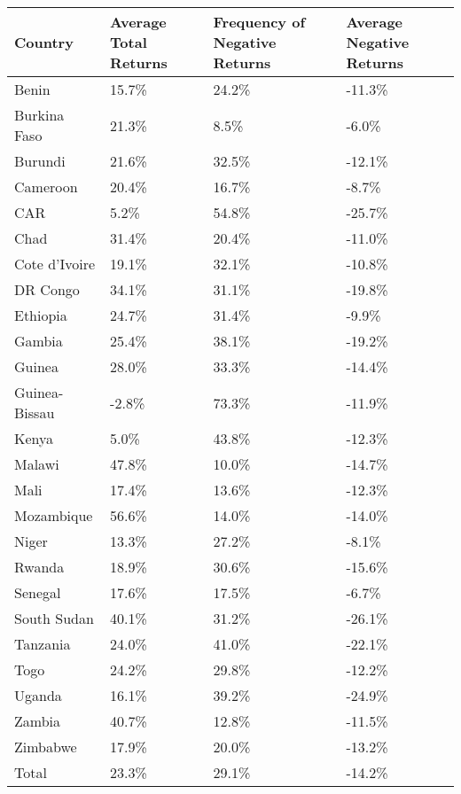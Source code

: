 \begin{table}[ht]
\centering
\begin{tabular}{llll}
  \hline
Country & Average Total Returns & Frequency of Negative Returns & Average Negative Returns \\ 
  \hline
Benin & 15.7\% & 24.2\% & -11.3\% \\ 
  Burkina Faso & 21.3\% & 8.5\% & -6.0\% \\ 
  Burundi & 21.6\% & 32.5\% & -12.1\% \\ 
  Cameroon & 20.4\% & 16.7\% & -8.7\% \\ 
  CAR & 5.2\% & 54.8\% & -25.7\% \\ 
  Chad & 31.4\% & 20.4\% & -11.0\% \\ 
  Cote d'Ivoire & 19.1\% & 32.1\% & -10.8\% \\ 
  DR Congo & 34.1\% & 31.1\% & -19.8\% \\ 
  Ethiopia & 24.7\% & 31.4\% & -9.9\% \\ 
  Gambia & 25.4\% & 38.1\% & -19.2\% \\ 
  Guinea & 28.0\% & 33.3\% & -14.4\% \\ 
  Guinea-Bissau & -2.8\% & 73.3\% & -11.9\% \\ 
  Kenya & 5.0\% & 43.8\% & -12.3\% \\ 
  Malawi & 47.8\% & 10.0\% & -14.7\% \\ 
  Mali & 17.4\% & 13.6\% & -12.3\% \\ 
  Mozambique & 56.6\% & 14.0\% & -14.0\% \\ 
  Niger & 13.3\% & 27.2\% & -8.1\% \\ 
  Rwanda & 18.9\% & 30.6\% & -15.6\% \\ 
  Senegal & 17.6\% & 17.5\% & -6.7\% \\ 
  South Sudan & 40.1\% & 31.2\% & -26.1\% \\ 
  Tanzania & 24.0\% & 41.0\% & -22.1\% \\ 
  Togo & 24.2\% & 29.8\% & -12.2\% \\ 
  Uganda & 16.1\% & 39.2\% & -24.9\% \\ 
  Zambia & 40.7\% & 12.8\% & -11.5\% \\ 
  Zimbabwe & 17.9\% & 20.0\% & -13.2\% \\ 
  Total & 23.3\% & 29.1\% & -14.2\% \\ 
   \hline
\end{tabular}
\end{table}
